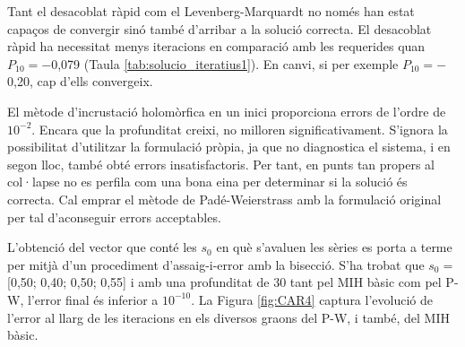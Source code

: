 Tant el desacoblat ràpid com el Levenberg-Marquardt no només han estat capaços de convergir sinó també d'arribar a la solució correcta. El desacoblat ràpid ha necessitat menys iteracions en comparació amb les requerides quan $P_{10}=-$0,079 (Taula \ref{tab:solucio_iteratius1}). En canvi, si per exemple $P_{10}=-$0,20, cap d'ells convergeix. 

El mètode d'incrustació holomòrfica en un inici proporciona errors de l'ordre de $10^{-2}$. Encara que la profunditat creixi, no milloren significativament. S'ignora la possibilitat d'utilitzar la formulació pròpia, ja que no diagnostica el sistema, i en segon lloc, també obté errors insatisfactoris. Per tant, en punts tan propers al col·lapse no es perfila com una bona eina per determinar si la solució és correcta. Cal emprar el mètode de Padé-Weierstrass amb la formulació original per tal d'aconseguir errors acceptables.

L'obtenció del vector que conté les $s_0$ en què s'avaluen les sèries es porta a terme per mitjà d'un procediment d'assaig-i-error amb la bisecció. S'ha trobat que $s_0=$[0,50; 0,40; 0,50; 0,55] i amb una profunditat de 30 tant pel MIH bàsic com pel P-W, l'error final és inferior a $10^{-10}$. La Figura \ref{fig:CAR4} captura l'evolució de l'error al llarg de les iteracions en els diversos graons del P-W, i també, del MIH bàsic.  

